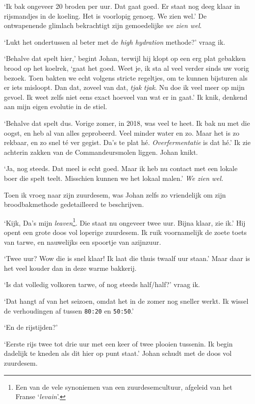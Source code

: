 \documentclass[
  11pt,
  dutch,
]{memoir}
\begin{document}
`Ik bak ongeveer 20 broden per uur. Dat gaat goed. Er staat nog deeg
klaar in rijsmandjes in de koeling. Het is voorlopig genoeg. We zien
wel.' De ontwapenende glimlach bekrachtigt zijn gemoedelijke \emph{we
zien wel}.

`Lukt het ondertussen al beter met de \emph{high hydration} methode?'
vraag ik.

`Behalve dat spelt hier,' begint Johan, terwijl hij klopt op een erg
plat gebakken brood op het koelrek, `gaat het goed. Weet je, ik sta al
veel verder sinds uw vorig bezoek. Toen bakten we echt volgens stricte
regeltjes, om te kunnen bijsturen als er iets misloopt. Dan dat, zoveel
van dat, \emph{tjak tjak}. Nu doe ik veel meer op mijn gevoel. Ik weet
zelfs niet eens exact hoeveel van wat er in gaat.' Ik knik, denkend aan
mijn eigen evolutie in de stiel.

`Behalve dat spelt dus. Vorige zomer, in 2018, was veel te heet. Ik bak
nu met die oogst, en heb al van alles geprobeerd. Veel minder water en
zo. Maar het is zo rekbaar, en zo snel té ver gegist. Da's te plat hé.
\emph{Overfermentatie} is dat hé.' Ik zie achterin zakken van de
Commandeursmolen liggen. Johan knikt.

`Ja, nog steeds. Dat meel is echt goed. Maar ik heb nu contact met een
lokale boer die spelt teelt. Misschien kunnen we het lokaal malen.'
\emph{We zien wel.}

Toen ik vroeg naar zijn zuurdesem, was Johan zelfs zo vriendelijk om
zijn broodbakmethode gedetailleerd te beschrijven.

`Kijk, Da's mijn \emph{leaven}\footnote{Een van de vele synoniemen van
  een zuurdesemcultuur, afgeleid van het Franse `\emph{levain}'.}. Die
staat nu ongeveer twee uur. Bijna klaar, zie ik.' Hij opent een grote
doos vol loperige zuurdesem. Ik ruik voornamelijk de zoete toets van
tarwe, en nauwelijks een spoortje van azijnzuur.

`Twee uur? Wow die is snel klaar! Ik laat die thuis twaalf uur staan.'
Maar daar is het veel kouder dan in deze warme bakkerij.

`Is dat volledig volkoren tarwe, of nog steeds half/half?' vraag ik.

`Dat hangt af van het seizoen, omdat het in de zomer nog sneller werkt.
Ik wissel de verhoudingen af tussen \texttt{80:20} en \texttt{50:50}.'

`En de rijstijden?'

`Eerste rijs twee tot drie uur met een keer of twee plooien tussenin. Ik
begin dadelijk te kneden als dit hier op punt staat.' Johan schudt met
de doos vol zuurdesem.
\end{document}

